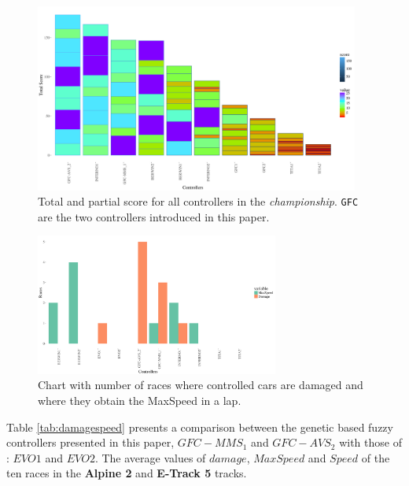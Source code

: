 \documentclass[conference]{IEEEtran}
\begin{document}
\begin{figure}[h!tb]	
  \begin{center}
    \includegraphics[width=0.95\textwidth]{fig/POINTS.png}
    \caption{Total and partial score for all controllers in the {\em
        championship}. {\tt GFC} are the two controllers introduced in
    this paper.}
    \label{fig:points}	
  \end{center}	
\end{figure}
%
\begin{figure}[!ht]	
	\begin{center}
          \includegraphics[width=8cm]{fig/HISTSD.png}
		\caption{Chart with number of races where controlled
                  cars are  damaged and where they obtain the MaxSpeed
                in a lap.}
		\label{fig:damspeed}	
	\end{center}	
\end{figure}

Table \ref{tab:damagespeed} presents a comparison between the genetic based fuzzy controllers presented in this paper, \textbf{$GFC-MMS_1$} and \textbf{$GFC-AVS_2$} with  
those of  \cite{evo18}: $EVO1$  and $EVO2$. The average values of $damage$, $MaxSpeed$ and $Speed$ of the ten races in the \textbf{Alpine 2} and  \textbf{E-Track 5} tracks.
\end{document}
